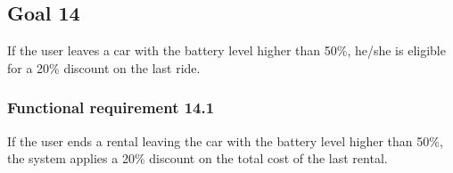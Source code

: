 \subsection{Goal 14}
If the user leaves a car with the battery level higher than 50\%, he/she is eligible for a 20\% discount on the last ride.

\setcounter{secnumdepth}{3}
\subsubsection{Functional requirement 14.1}
If the user ends a rental leaving the car with the battery level higher than 50\%, the system applies a 20\% discount on the total cost of the last rental.
